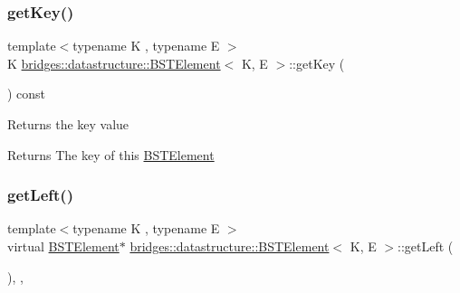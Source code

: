 \mbox{\label{classbridges_1_1datastructure_1_1_b_s_t_element_a66bd1d5874e4e0c8048e03e5fff07f86}} 
\subsubsection{\texorpdfstring{get\+Key()}{getKey()}}
{\footnotesize\ttfamily template$<$typename K , typename E $>$ \\
K \hyperlink{classbridges_1_1datastructure_1_1_b_s_t_element}{bridges\+::datastructure\+::\+B\+S\+T\+Element}$<$ K, E $>$\+::get\+Key (\begin{DoxyParamCaption}{ }\end{DoxyParamCaption}) const\hspace{0.3cm}{\ttfamily [inline]}}

Returns the key value \begin{DoxyReturn}{Returns}
The key of this \hyperlink{classbridges_1_1datastructure_1_1_b_s_t_element}{B\+S\+T\+Element} 
\end{DoxyReturn}
\mbox{\label{classbridges_1_1datastructure_1_1_b_s_t_element_af863c624691c11db26ae3b6d723d1f5c}} 
\subsubsection{\texorpdfstring{get\+Left()}{getLeft()}\hspace{0.1cm}{\footnotesize\ttfamily [1/2]}}
{\footnotesize\ttfamily template$<$typename K , typename E $>$ \\
virtual \hyperlink{classbridges_1_1datastructure_1_1_b_s_t_element}{B\+S\+T\+Element}$\ast$ \hyperlink{classbridges_1_1datastructure_1_1_b_s_t_element}{bridges\+::datastructure\+::\+B\+S\+T\+Element}$<$ K, E $>$\+::get\+Left (\begin{DoxyParamCaption}{ }\end{DoxyParamCaption})\hspace{0.3cm}{\ttfamily [inline]}, {\ttfamily [override]}, {\ttfamily [virtual]}}

